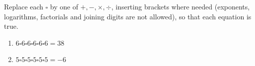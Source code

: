 Replace each $\square$ by one of $+,-,\times,\div$, inserting brackets where needed (exponents, logarithms, factorials and joining digits are not allowed), so that each equation is true.
\begin{enumerate}
\item[(a)] $6\square6\square6\square6\square6\square6=38$
\item[(b)] $5\square5\square5\square5\square5\square5=-6$
\end{enumerate}
